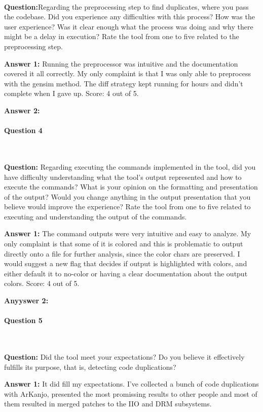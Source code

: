 \

\textbf{Question:}Regarding the preprocessing step to find duplicates, where you pass the codebase. 
Did you experience any difficulties with this process? How was the user experience? 
Was it clear enough what the process was doing and why there might be a delay in execution?
Rate the tool  from one to five related to the preprocessing step.

\textbf{Answer 1:} Running the preprocessor was intuitive and the documentation covered 
it all correctly. My only complaint is that I was only able to preprocess with the gensim method. 
The diff strategy kept running for hours and didn't complete when I gave up. Score: 4 out of 5.

\textbf{Answer 2:} 

\paragraph{Question 4}

\

\textbf{Question:} Regarding executing the commands implemented in the tool, did you 
have difficulty understanding what the tool's output represented and how to execute the commands?
What is your opinion on the formatting and presentation of the output? Would you change anything 
in the output presentation that you believe would improve the experience?
Rate the tool  from one to five related to executing and understanding the output of the commands.

\textbf{Answer 1:} The command outputs were very intuitive and easy to analyze. My only complaint 
is that some of it is colored and this is problematic to output directly onto a file for further analysis, 
since the color chars are preserved. I would suggest a new flag that decides if output is highlighted 
with colors, and either default it to no-color or having a clear documentation about the output colors.
Score: 4 out of 5.

\textbf{Anyyswer 2:}

\paragraph{Question 5}

\

\textbf{Question:} Did the tool meet your expectations? Do you believe it effectively 
fulfills its purpose, that is, detecting code duplications?

\textbf{Answer 1:} It did fill my expectations. I've collected a bunch of code duplications with ArKanjo,
presented the most promissing results to other people and most of them resulted in merged patches to the 
IIO and DRM subsystems.

